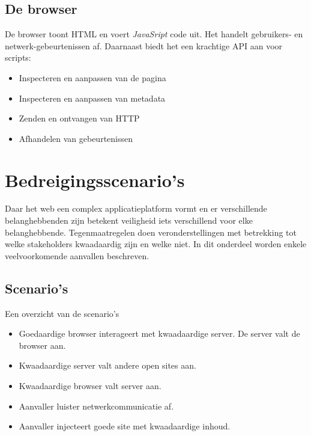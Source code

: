 \documentclass[../main.tex]{subfiles}
\begin{document}
\subsection{De browser}
De browser toont HTML en voert \textit{JavaSript} code uit. Het handelt gebruikers- en netwerk-gebeurtenissen af. Daarnaast biedt het een krachtige API aan voor scripts:
\begin{multicols}{2}
\begin{itemize}
	\item Inspecteren en aanpassen van de pagina
	\item Inspecteren en aanpassen van metadata
	\item Zenden en ontvangen van HTTP
	\item Afhandelen van gebeurtenissen
\end{itemize} 
\end{multicols}

\section{Bedreigingsscenario's}
Daar het web een complex applicatieplatform vormt en er verschillende belanghebbenden zijn betekent veiligheid iets verschillend voor elke belanghebbende. Tegenmaatregelen doen veronderstellingen met betrekking tot welke stakeholders kwaadaardig zijn en welke niet. In dit onderdeel worden enkele veelvoorkomende aanvallen beschreven.

\subsection{Scenario's}
Een overzicht van de scenario's
\begin{itemize}
	\item Goedaardige browser interageert met kwaadaardige server. De server valt de browser aan.
	\item Kwaadaardige server valt andere open sites aan.
	\item Kwaadaardige browser valt server aan.
	\item Aanvaller luister netwerkcommunicatie af.
	\item Aanvaller injecteert goede site met kwaadaardige inhoud.
\end{itemize}
\end{document}
